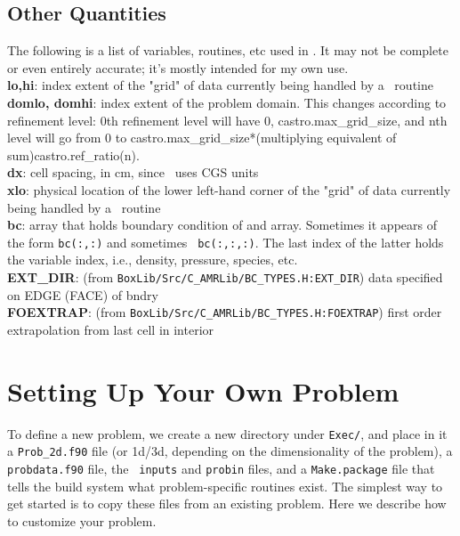 \subsection{Other Quantities}

The following is a list of variables, routines, etc used in \castro. It
may not be complete or even entirely accurate; it's mostly intended
for my own use.\\

{\bf lo,hi}: index extent of the "grid" of data currently being
handled by a \castro\ routine\\

{\bf domlo, domhi}: index extent of the problem domain. This changes
according to refinement level: 0th refinement level will have 0,
castro.max\_grid\_size, and nth level will go from 0 to
castro.max\_grid\_size*(multiplying equivalent of
sum)castro.ref\_ratio(n).\\

{\bf dx}: cell spacing, in cm, since \castro\ uses CGS
units\\

{\bf xlo}: physical location of the lower left-hand corner of the
"grid" of data currently being handled by a \castro\ routine\\

{\bf bc}: array that holds boundary condition of and array. Sometimes
it appears of the form {\tt bc(:,:)} and sometimes {\tt
  bc(:,:,:)}. The last index of the latter holds the variable index,
i.e., density, pressure, species, etc.\\

{\bf EXT\_DIR}: (from {\tt BoxLib/Src/C\_AMRLib/BC\_TYPES.H:EXT\_DIR}) data
specified on EDGE (FACE) of bndry\\

{\bf FOEXTRAP}: (from {\tt BoxLib/Src/C\_AMRLib/BC\_TYPES.H:FOEXTRAP}) first
order extrapolation from last cell in interior \castro


\section{Setting Up Your Own Problem}

To define a new problem, we create a new directory under {\tt Exec/},
and place in it a {\tt Prob\_2d.f90} file (or 1d/3d, depending on the
dimensionality of the problem), a {\tt probdata.f90} file, the {\tt
  inputs} and {\tt probin} files, and a {\tt Make.package} file that
tells the build system what problem-specific routines exist.  The
simplest way to get started is to copy these files from an existing
problem.  Here we describe how to customize your problem.

